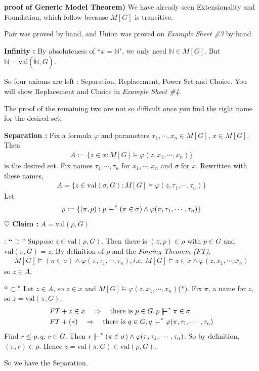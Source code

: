 \documentclass[12pt,a4paper]{article}
\newenvironment{proof}
{\begin{changemargin}{0.5cm}{0.5cm} 
	}%
	{\end{changemargin}
}
\newenvironment{subproof}
{\begin{changemargin}{0.5cm}{0.5cm} 
	}%
	{\end{changemargin}
}
\newenvironment{p}
{\begin{proof} 
	}%
	{\end{proof}
}
\begin{document}
\begin{p}
\textbf{proof of Generic Model Theorem)} We have already seen Extensionality and Foundation, which follow because $M[G]$ is transitive.

\quad Pair was proved by hand, and Union was proved on \emph{Example Sheet \#3} by hand.
\s

\textbf{Infinity :} By absoluteness of ``$x=\mathbb{N}$", we only need $\mathbb{N} \in M[G]$. But $\mathbb{N} = \text{val} (\check{\mathbb{N}}, G)$.

\quad So four axioms are left : Separation, Replacement, Power Set and Choice. You will show Replacement and Choice in \emph{Example Sheet \#4}.

\quad The proof of the remaining two are not so difficult once you find the right name for the desired set.
\s

\textbf{Separation :} Fix a formula $\varphi$ and parameters $x_1, \cdots, x_n \in M[G]$, $x\in M[G]$. Then
\begin{align*}
A:= \{ z\in x : M[G] \models \varphi(z, x_1, \cdots, x_n)\}
\end{align*}
is the desired set. Fix names $\tau_1, \cdots, \tau_n$ for $x_1, \cdots, x_n$ and $\sigma$ for $x$. Rewritten with these names,
\begin{align*}
A =\{z\in \text{val}(\sigma, G) : M[G] \models \varphi(z, \tau_1, \cdots, \tau_n ) \}
\end{align*}
Let
\begin{align*}
\rho := \{(\pi, p): p\forces^* (\pi \in \sigma) \wedge \varphi(\pi, \tau_1, \cdots, \tau_n)\}
\end{align*}
\textbf{$\heartsuit$ Claim :} $A= \text{val}(\rho, G)$
\begin{subproof}
: \textbf{``$\supset$"} Suppose $z\in \text{val}(\rho, G)$. Then there is $(\pi, p) \in \rho$ with $p\in G$ and $\text{val}(\pi, G) =z$. By definition of $\rho$ and the \emph{Forcing Theorem (FT)}, 
\begin{align*}
M[G] \models (\pi \in \sigma) \wedge \varphi(\pi, \tau_1, \cdots, \tau_n), \textit{i.e. } M[G] \models z\in x \wedge \varphi(z, x_1, \cdots, x_n) 
\end{align*}
so $z\in A$.

\textbf{``$\subset$"} Let $z\in A$, so $z\in x$ and $M[G] \models \varphi(z, x_1, \cdots, x_n)$($*$). Fix $\pi$, a name for $z$, so $z= \text{val}(\pi, G)$.
\begin{align*}
& FT + z\in x \quad  \Rightarrow \quad \text{there is } p\in G, p\forces^* \pi \in \sigma\\
& FT + (*) \quad \Rightarrow \quad \text{there is } q\in G, q\forces^* \varphi(\pi, \tau_1, \cdots, \tau_n)
\end{align*}
Find $r\leq p, q$, $r\in G$. Then $r\forces^* (\pi \in \sigma) \wedge \varphi(\pi, \tau_1, \cdots, \tau_n)$. So by definition, $(\pi, r) \in \rho$. Hence $z= \text{val}(\pi, G) \in \text{val}(\rho, G)$.
\end{subproof}
So we have the Separation.
\s


\end{p}
\end{document}
